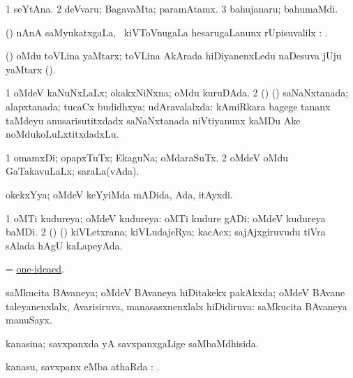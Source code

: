 \noindent
\gl{\pagu}
\bmng
\bnum
\num{1}  seYtAna. 
\num{2}  deVvaru; BagavaMta; paramAtamx. 
\num{3}  bahujanaru; bahumaMdi. 
\enum
\emng
\eentry

\bentry
{}
\gl{\uparx}
\bmng
(\ravi) nAnA saMyukatxgaLa, \kanmu\ kiVToVnugaLa hesarugaLanunx rUpisuvalilx \parx: . 
\emng
\eentry

\bentry
{}
\gl{\nA}
\bmng
(\AmA) oMdu toVLina yaMtarx; toVLina AkArada hiDiyanenxLedu naDesuva jUju yaMtarx (). 
\emng
\eentry

\bentry
{}
\gl{\gu}
\bmng
\bnum
\num{1} oMdeV kaNuNxLaLx; okakxNiNxna; oMdu kuruDAda. 
\num{2} (\rUpa) (\ashi) saNaNxtanada; alapxtanada; tucaCx budidhxya; udAravalalxda:  kAmiRkara bagege tananx taMdeyu anusarisutitxdadx saNaNxtanada niVtiyanunx kaMDu Ake noMdukoLuLxtitxdadxLu. 
\enum
\emng
\eentry

\bentry
{}
\gl{\gu}
\bmng
\bnum
\num{1} omamxDi; opapxTuTx; EkaguNa; oMdaraSuTx. 
\num{2} oMdeV oMdu GaTakavuLaLx; saraLa(vAda). 
\enum
\emng
\eentry

\bentry
{}
\gl{\gu}
\bmng
okekxYya; oMdeV keYyiMda mADida, Ada, itAyxdi. 
\emng
\eentry

\bentry
{}
\gl{\gu}
\bmng
\bnum
\num{1} oMTi kudureya; oMdeV kudureya:  oMTi kudure gADi; oMdeV kudureya baMDi. 
\num{2} (\rUpa) (\AmA) kiVLetxrana; kiVLudajeRya; kacAcx; sajAjxgiruvudu tiVra sAlada hAgU kaLapeyAda. 
\enum
\emng
\eentry

\bentry
{}
\gl{\gu}
\bmng
= \hyperlink{one-ideaed}{one-ideaed}. 
\emng
\eentry

\bentry
{}
\gl{\gu}
\bmng
saMkucita BAvaneya; oMdeV BAvaneya hiDitakekx pakAkxda; oMdeV BAvane taleyanenxlalx, Avarisiruva, manasasxnenxlalx hiDidiruva:  saMkucita BAvaneya manuSayx. 
\emng
\eentry

\bentry
{}
\gl{\gu}
\bmng
kanasina; savxpanxda yA savxpanxgaLige saMbaMdhisida. 
\emng
\eentry

\bentry
{}
\gl{\sapUpa}
\bmng
kanasu, savxpanx eMba athaRda \sapUpa: . 
\emng
\eentry

